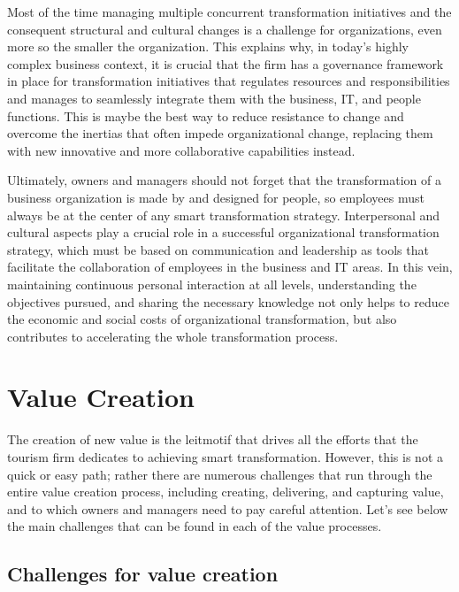 \documentclass[
  letterpaper,
  DIV=11,
  numbers=noendperiod]{scrreprt}
\begin{document}
Most of the time managing multiple concurrent transformation initiatives
and the consequent structural and cultural changes is a challenge for
organizations, even more so the smaller the organization. This explains
why, in today's highly complex business context, it is crucial that the
firm has a governance framework in place for transformation initiatives
that regulates resources and responsibilities and manages to seamlessly
integrate them with the business, IT, and people functions. This is
maybe the best way to reduce resistance to change and overcome the
inertias that often impede organizational change, replacing them with
new innovative and more collaborative capabilities instead.

Ultimately, owners and managers should not forget that the
transformation of a business organization is made by and designed for
people, so employees must always be at the center of any smart
transformation strategy. Interpersonal and cultural aspects play a
crucial role in a successful organizational transformation strategy,
which must be based on communication and leadership as tools that
facilitate the collaboration of employees in the business and IT areas.
In this vein, maintaining continuous personal interaction at all levels,
understanding the objectives pursued, and sharing the necessary
knowledge not only helps to reduce the economic and social costs of
organizational transformation, but also contributes to accelerating the
whole transformation process.

\hypertarget{value-creation}{%
\section{Value Creation}\label{value-creation}}

The creation of new value is the leitmotif that drives all the efforts
that the tourism firm dedicates to achieving smart transformation.
However, this is not a quick or easy path; rather there are numerous
challenges that run through the entire value creation process, including
creating, delivering, and capturing value, and to which owners and
managers need to pay careful attention. Let's see below the main
challenges that can be found in each of the value processes.

\hypertarget{challenges-for-value-creation}{%
\subsection{Challenges for value
creation}\label{challenges-for-value-creation}}
\end{document}
